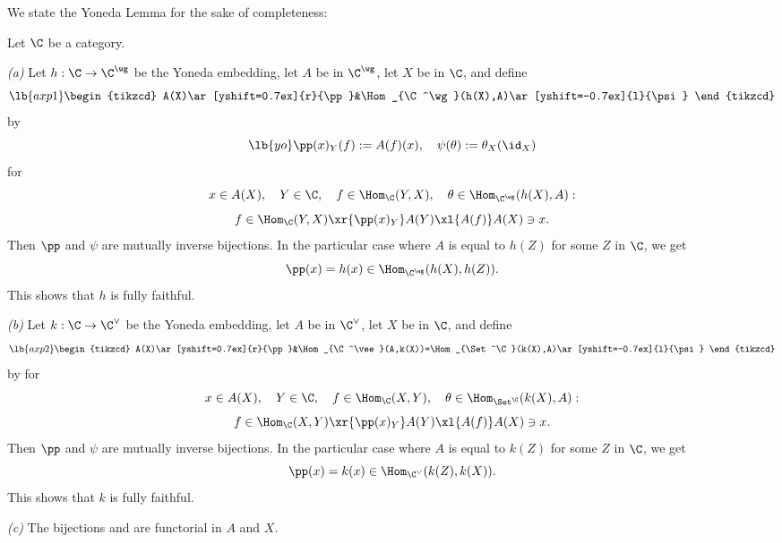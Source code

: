 \documentclass[12pt]{article}
\theoremstyle{remark}
\theoremstyle{definition}
\begin{document}

We state the Yoneda Lemma for the sake of completeness:

\begin{thm}
Let $\C$ be a category.

\nn\emph{(a)} Let $h:\C\to\C^\wg$ be the Yoneda embedding, let $A$ be in $\C^\wg$, let $X$ be in $\C$, and define 
\begin{equation}\lb{axp1}
\begin{tikzcd} 
A(X)\ar[yshift=0.7ex]{r}{\pp}&\Hom_{\C^\wg}(h(X),A)\ar[yshift=-0.7ex]{l}{\psi}
\end{tikzcd}
\end{equation} 
by 
\begin{equation}\lb{yo}
\pp(x)_Y(f):=A(f)(x),\quad\psi(\theta):=\theta_X(\id_X)
\end{equation}
for 
$$
x\in A(X),\quad Y\in\C,\quad f\in\Hom_\C(Y,X),\quad\theta\in\Hom_{\C^\wg}(h(X),A):
$$ 
$$
f\in\Hom_\C(Y,X)\xr{\pp(x)_Y}A(Y)\xl{A(f)}A(X)\ni x.
$$
Then $\pp$ and $\psi$ are mutually inverse bijections. In the particular case where $A$ is equal to $h(Z)$ for some $Z$ in $\C$, we get 
$$
\pp(x)=h(x)\in\Hom_{\C^\wg}(h(X),h(Z)).
$$
This shows that $h$ is fully faithful.

\nn\emph{(b)} Let $k:\C\to\C^\vee$ be the Yoneda embedding, let $A$ be in $\C^\vee$, let $X$ be in $\C$, and define 
\begin{equation}\lb{axp2}
\begin{tikzcd} 
A(X)\ar[yshift=0.7ex]{r}{\pp}&\Hom_{\C^\vee}(A,k(X))=\Hom_{\Set^\C}(k(X),A)\ar[yshift=-0.7ex]{l}{\psi}
\end{tikzcd}
\end{equation}
by  for 
$$
x\in A(X),\quad Y\in\C,\quad f\in\Hom_\C(X,Y),\quad\theta\in\Hom_{\Set^\C}(k(X),A):
$$ 
$$
f\in\Hom_\C(X,Y)\xr{\pp(x)_Y}A(Y)\xl{A(f)}A(X)\ni x.
$$
Then $\pp$ and $\psi$ are mutually inverse bijections. In the particular case where $A$ is equal to $k(Z)$ for some $Z$ in $\C$, we get 
$$
\pp(x)=k(x)\in\Hom_{\C^\vee}(k(Z),k(X)).
$$
This shows that $k$ is fully faithful.

\nn\emph{(c)} The bijections  and  are functorial in $A$ and $X$.
\end{thm}
\end{document}
